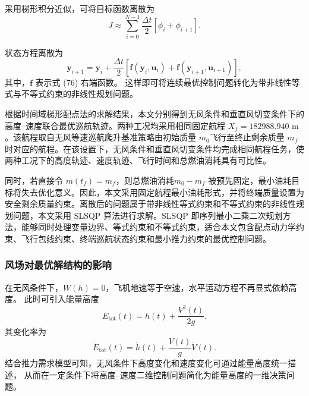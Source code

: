 \documentclass[withoutpreface,bwprint]{cumcmthesis} %
\begin{document}
采用梯形积分近似，可将目标函数离散为
\begin{equation}
    J
    \approx
    \sum_{i=0}^{N-1}
    \frac{\Delta t}{2}
    \left[
    \phi_i+\phi_{i+1}
    \right].
    \label{eq:q3_discrete_objective}
\end{equation}
  
状态方程离散为
\begin{equation}
    \boldsymbol y_{i+1}
    =
    \boldsymbol y_i
    +
    \frac{\Delta t}{2}
    \left[
    \boldsymbol f(\boldsymbol y_i,\boldsymbol u_i)
    +
    \boldsymbol f(\boldsymbol y_{i+1},\boldsymbol u_{i+1})
    \right],
    \label{eq:q3_trapezoid}
\end{equation}
其中，$\boldsymbol f$ 表示式 (76) 右端函数。
这样即可将连续最优控制问题转化为带非线性等式与不等式约束的非线性规划问题。

根据时间域梯形配点法的求解结果，本文分别得到无风条件和垂直风切变条件下的高度--速度联合最优巡航轨迹。两种工况均采用相同固定航程 $X_f=182988.940\text{ m}$。该航程取自无风等速巡航爬升基准策略由初始质量 $m_0$飞行至终止剩余质量 $m_f$时对应的航程。在该设置下，无风条件和垂直风切变条件均完成相同航程任务，使两种工况下的高度轨迹、速度轨迹、飞行时间和总燃油消耗具有可比性。

同时，若直接令 $m(t_f)=m_f$，则总燃油消耗$m_0-m_f$ 被预先固定，最小油耗目标将失去优化意义。因此，本文采用固定航程最小油耗形式，并将终端质量设置为安全剩余质量约束。离散后的问题属于带非线性等式约束和不等式约束的非线性规划问题，本文采用 SLSQP 算法进行求解。SLSQP 即序列最小二乘二次规划方法，能够同时处理变量边界、等式约束和不等式约束，适合本文包含配点动力学约束、飞行包线约束、终端巡航状态约束和最小推力约束的最优控制问题。

\subsubsection{风场对最优解结构的影响}

在无风条件下，$W(h)=0$，飞机地速等于空速，水平运动方程不再显式依赖高度。
此时可引入能量高度\cite{4}
\begin{equation}
    E_{\mathrm{tot}}(t)
    =
    h(t)+\frac{V^2(t)}{2g}.
    \label{eq:q3_energy_height}
\end{equation}
其变化率为
\begin{equation}
    \dot E_{\mathrm{tot}}(t)
    =
    \dot h(t)+\frac{V(t)}{g}\dot V(t).
    \label{eq:q3_Edot}
\end{equation}
结合推力需求模型可知，无风条件下高度变化和速度变化可通过能量高度统一描述，
从而在一定条件下将高度--速度二维控制问题简化为能量高度的一维决策问题。
\end{document}
